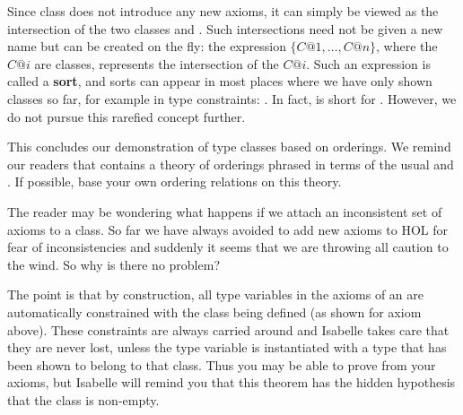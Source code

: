 \begin{isabellebody}
\begin{isamarkuptext}
Since class  does not introduce any new axioms, it can simply
be viewed as the intersection of the two classes  and . Such intersections need not be given a new name but can be created on
the fly: the expression $\{C@1,\dots,C@n\}$, where the $C@i$ are classes,
represents the intersection of the $C@i$. Such an expression is called a
\textbf{sort}, and sorts can appear in most places where we have only shown
classes so far, for example in type constraints: .
In fact,  is short for .
However, we do not pursue this rarefied concept further.

This concludes our demonstration of type classes based on orderings.  We
remind our readers that  contains a theory of
orderings phrased in terms of the usual \isa{{\isasymle}} and \isa{{\isacharless}}.
If possible, base your own ordering relations on this theory.%
\end{isamarkuptext}%
\isamarkuptrue%
%
\isamarkuptrue%
%
\begin{isamarkuptext}%
The reader may be wondering what happens if we
attach an inconsistent set of axioms to a class. So far we have always
avoided to add new axioms to HOL for fear of inconsistencies and suddenly it
seems that we are throwing all caution to the wind. So why is there no
problem?

The point is that by construction, all type variables in the axioms of an
 are automatically constrained with the class being
defined (as shown for axiom  above). These constraints are
always carried around and Isabelle takes care that they are never lost,
unless the type variable is instantiated with a type that has been shown to
belong to that class. Thus you may be able to prove 
from your axioms, but Isabelle will remind you that this
theorem has the hidden hypothesis that the class is non-empty.%
\end{isamarkuptext}%
\isamarkuptrue%
\isamarkupfalse%
\end{isabellebody}%
